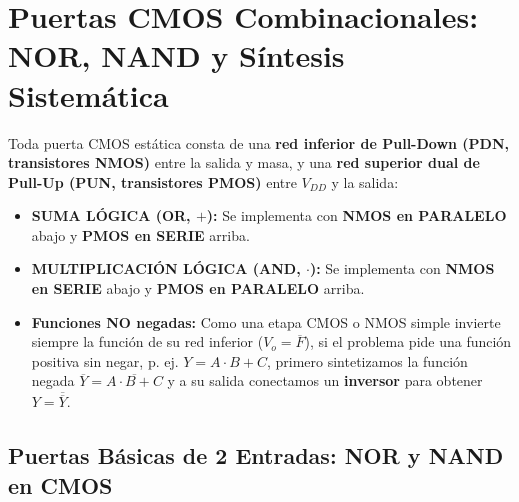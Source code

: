 \section{Puertas CMOS Combinacionales: NOR, NAND y Síntesis Sistemática}

\begin{ley}
Toda puerta CMOS estática consta de una \textbf{red inferior de Pull-Down (PDN, transistores NMOS)} entre la salida y masa, y una \textbf{red superior dual de Pull-Up (PUN, transistores PMOS)} entre $V_{DD}$ y la salida:
\begin{itemize}[leftmargin=*]
    \item \textbf{SUMA LÓGICA (OR, $+$):} Se implementa con \textbf{NMOS en PARALELO} abajo y \textbf{PMOS en SERIE} arriba.
    \item \textbf{MULTIPLICACIÓN LÓGICA (AND, $\cdot$):} Se implementa con \textbf{NMOS en SERIE} abajo y \textbf{PMOS en PARALELO} arriba.
    \item \textbf{Funciones NO negadas:} Como una etapa CMOS o NMOS simple invierte siempre la función de su red inferior ($V_o = \overline{F}$), si el problema pide una función positiva sin negar, p. ej. $Y = A \cdot B + C$, primero sintetizamos la función negada $\overline{Y} = \overline{A \cdot B + C}$ y a su salida conectamos un \textbf{inversor} para obtener $Y = \overline{\overline{Y}}$.
\end{itemize}
\end{ley}

\subsection{Puertas Básicas de 2 Entradas: NOR y NAND en CMOS}

